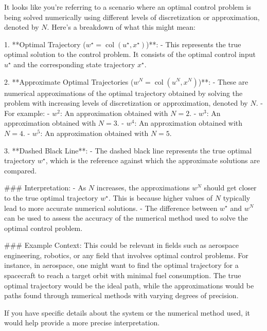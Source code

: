 It looks like you're referring to a scenario where an optimal control problem is being solved numerically using different levels of discretization or approximation, denoted by \( N \). Here's a breakdown of what this might mean:

1. **Optimal Trajectory (\( w^\star = \operatorname{col}(u^\star, x^\star) \))**:
   - This represents the true optimal solution to the control problem. It consists of the optimal control input \( u^\star \) and the corresponding state trajectory \( x^\star \).

2. **Approximate Optimal Trajectories (\( w^N = \operatorname{col}(u^N, x^N) \))**:
   - These are numerical approximations of the optimal trajectory obtained by solving the problem with increasing levels of discretization or approximation, denoted by \( N \).
   - For example:
     - \( w^2 \): An approximation obtained with \( N = 2 \).
     - \( w^3 \): An approximation obtained with \( N = 3 \).
     - \( w^4 \): An approximation obtained with \( N = 4 \).
     - \( w^5 \): An approximation obtained with \( N = 5 \).

3. **Dashed Black Line**:
   - The dashed black line represents the true optimal trajectory \( w^\star \), which is the reference against which the approximate solutions are compared.

### Interpretation:
- As \( N \) increases, the approximations \( w^N \) should get closer to the true optimal trajectory \( w^\star \). This is because higher values of \( N \) typically lead to more accurate numerical solutions.
- The difference between \( w^\star \) and \( w^N \) can be used to assess the accuracy of the numerical method used to solve the optimal control problem.

### Example Context:
This could be relevant in fields such as aerospace engineering, robotics, or any field that involves optimal control problems. For instance, in aerospace, one might want to find the optimal trajectory for a spacecraft to reach a target orbit with minimal fuel consumption. The true optimal trajectory would be the ideal path, while the approximations would be paths found through numerical methods with varying degrees of precision.

If you have specific details about the system or the numerical method used, it would help provide a more precise interpretation.